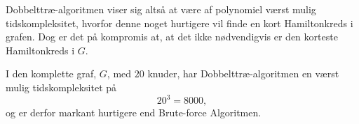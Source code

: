 Dobbelttræ-algoritmen viser sig altså at være af polynomiel værst mulig tidskompleksitet, hvorfor denne noget hurtigere vil finde en kort Hamiltonkreds i grafen. Dog er det på kompromis at, at det ikke nødvendigvis er den korteste Hamiltonkreds i $G$.

\begin{exmp}
I den komplette graf, $G$, med $20$ knuder, har Dobbelttræ-algoritmen en værst mulig tidskompleksitet på $$20^3 = 8000,$$ og er derfor markant hurtigere end Brute-force Algoritmen.
\end{exmp}
